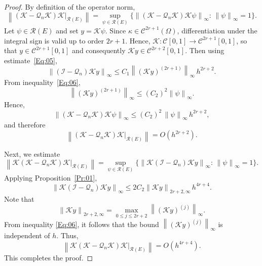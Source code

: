 \documentclass[]{interact}
\theoremstyle{plain}%
\theoremstyle{definition}
\theoremstyle{remark}
\newcommand{\norm}[1]{\left\lVert #1\right\rVert}
\begin{document}
\begin{proof}
	By definition of the operator norm,
	\[
	\norm{(\mathcal{K} - \mathcal{Q}_n \mathcal{K}) \mathcal{K} 
		\big|_{\mathcal{R}(E)}}
	=
	\sup_{\psi \in \mathcal{R}(E)}
	\Big\{
	\norm{(\mathcal{K} - \mathcal{Q}_n \mathcal{K}) \mathcal{K} \psi }_\infty
	:\, \norm{\psi}_\infty = 1
	\Big\}.
	\]	
	Let $\psi \in \mathcal{R}(E)$ and set $y = \mathcal{K}\psi$. 
	Since $\kappa \in \mathcal{C}^{2r+1}(\Omega)$, differentiation under 
	the integral sign is valid up to order $2r+1$. Hence,
	$\mathcal{K} : \mathcal{C}[0,1] \to \mathcal{C}^{2r+1}[0,1]$, 
	so that $y \in \mathcal{C}^{2r+1}[0,1]$ and consequently 
	$\mathcal{K}y \in \mathcal{C}^{2r+2}[0,1]$.
	Then using estimate~\eqref{Eq:05},
	\[
	\norm{(\mathcal{I} - \mathcal{Q}_n)\mathcal{K}y}_\infty
	\le
	C_1 \norm{(\mathcal{K}y)^{(2r+1)}}_\infty\, h^{2r+2}.
	\]
	From inequality~\eqref{Eq:06},
	\[
	\norm{(\mathcal{K}y)^{(2r+1)}}_\infty
	\le
	(C_2)^2 \norm{\psi}_\infty.
	\]
	Hence,
	\[
	\norm{(\mathcal{K} - \mathcal{Q}_n \mathcal{K}) \mathcal{K} \psi }_\infty
	\le
	(C_2)^2\, \norm{\psi}_\infty\, h^{2r+2},
	\]
	and therefore
	\[
	\norm{(\mathcal{K} - \mathcal{Q}_n \mathcal{K}) \mathcal{K} 
		\big|_{\mathcal{R}(E)}}
	=
	O\left(h^{2r+2}\right).
	\]
	
	Next, we estimate
	\[
	\norm{\mathcal{K}(\mathcal{K} - \mathcal{Q}_n \mathcal{K}) 
		\mathcal{K} \big|_{\mathcal{R}(E)}}
	=
	\sup_{\psi \in \mathcal{R}(E)}
	\Big\{
	\norm{\mathcal{K}(\mathcal{I} - \mathcal{Q}_n)\mathcal{K}y}_\infty
	:\, \norm{\psi}_\infty = 1
	\Big\}.
	\]
	Applying Proposition~\ref{Pr:01},
	\[
	\norm{\mathcal{K}(\mathcal{I} - \mathcal{Q}_n)\mathcal{K}y}_\infty
	\le
	2C_2 \norm{\mathcal{K}y}_{2r+2,\infty}\, h^{4r+4}.
	\]
	Note that 
	\begin{equation*}
		\norm{\mathcal{K}y}_{2r+2, \infty} = \max_{0 \leq j \leq2r +2} \norm{ \left(\mathcal{K}y\right)^{(j)}}_\infty.
	\end{equation*}
	From inequality \eqref{Eq:06}, it follows that the bound $\norm{(\mathcal{K}y)^{(j)}}_\infty$ is independent of $h$.
	Thus,
	\[
	\norm{\mathcal{K}(\mathcal{K} - \mathcal{Q}_n \mathcal{K}) 
		\mathcal{K} \big|_{\mathcal{R}(E)}}
	=
	O\left(h^{4r+4}\right).
	\]
	This completes the proof.
\end{proof} 
\end{document}
